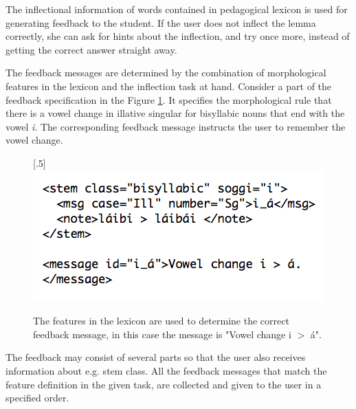 \documentclass[11pt]{article}
\begin{document}
The inflectional information of words contained in pedagogical lexicon is used for generating feedback to the student. If the user does not inflect the lemma correctly, she can ask for hints about the inflection, and try once more, instead of getting the correct answer straight away. 

The feedback messages are determined by the combination of morphological features in the lexicon and the inflection task at hand. Consider a part of the feedback specification in the Figure \ref{feedbacknouns}. It specifies the morphological rule that there is a vowel change in illative singular for bisyllabic nouns that end with the vowel \textit{i}. The corresponding feedback message instructs the user to remember the vowel change.

\begin{figure}[htbp]
\begin{center}
\scalebox{.5}[.5]{\includegraphics{presentation/img/morphfeedbackEng.png}}\\
\caption{The features in the lexicon are used to determine the correct feedback message, in this case the message is "Vowel change i $>$ á".}
\label{feedbacknouns}
\end{center}
\end{figure}

The feedback may consist of several parts so that the user also receives information about e.g. stem class. All the feedback messages that match the feature definition in the given task, are collected and given to the user in a specified order. 
\end{document}
